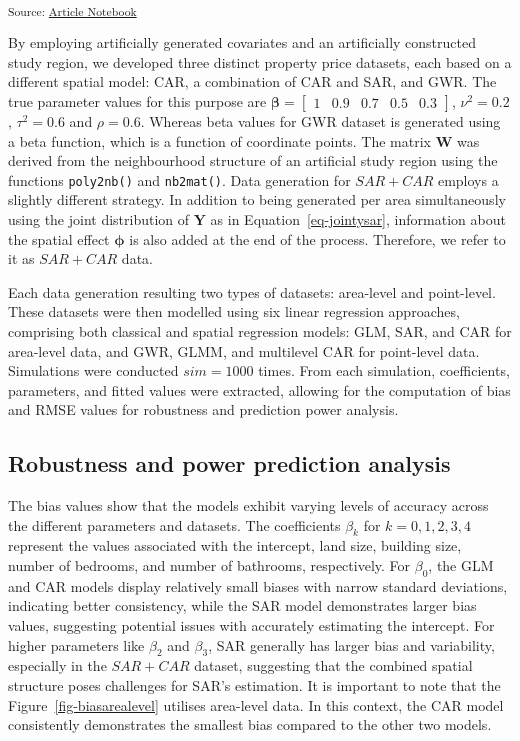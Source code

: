 \documentclass[
  default,
]{sn-jnl}
\begin{document}
\endgroup{}

\textsubscript{Source:
\href{https://indiraputeri-phd.github.io/CAR_simcomp/manuscript.qmd.html}{Article
Notebook}}

By employing artificially generated covariates and an artificially
constructed study region, we developed three distinct property price
datasets, each based on a different spatial model: CAR, a combination of
CAR and SAR, and GWR. The true parameter values for this purpose are
\(\boldsymbol{\beta} = \begin{bmatrix} 1 & 0.9 & 0.7 & 0.5 & 0.3 \end{bmatrix}\),
\(\nu^2 = 0.2\), \(\tau^2 = 0.6\) and \(\rho = 0.6\). Whereas beta
values for GWR dataset is generated using a beta function, which is a
function of coordinate points. The matrix \(\mathbf{W}\) was derived
from the neighbourhood structure of an artificial study region using the
functions \texttt{poly2nb()} and \texttt{nb2mat()}. Data generation for
\(SAR + CAR\) employs a slightly different strategy. In addition to
being generated per area simultaneously using the joint distribution of
\(\mathbf{Y}\) as in Equation~\ref{eq-jointysar}, information about the
spatial effect \(\boldsymbol{\phi}\) is also added at the end of the
process. Therefore, we refer to it as \(SAR + CAR\) data.

Each data generation resulting two types of datasets: area-level and
point-level. These datasets were then modelled using six linear
regression approaches, comprising both classical and spatial regression
models: GLM, SAR, and CAR for area-level data, and GWR, GLMM, and
multilevel CAR for point-level data. Simulations were conducted
\(sim = 1000\) times. From each simulation, coefficients, parameters,
and fitted values were extracted, allowing for the computation of bias
and RMSE values for robustness and prediction power analysis.

\subsection{Robustness and power prediction
analysis}\label{robustness-and-power-prediction-analysis}

The bias values show that the models exhibit varying levels of accuracy
across the different parameters and datasets. The coefficients
\(\beta_k\) for \(k = 0, 1, 2, 3, 4\) represent the values associated
with the intercept, land size, building size, number of bedrooms, and
number of bathrooms, respectively. For \(\beta_0\), the GLM and CAR
models display relatively small biases with narrow standard deviations,
indicating better consistency, while the SAR model demonstrates larger
bias values, suggesting potential issues with accurately estimating the
intercept. For higher parameters like \(\beta_2\) and \(\beta_3\), SAR
generally has larger bias and variability, especially in the
\(SAR + CAR\) dataset, suggesting that the combined spatial structure
poses challenges for SAR's estimation. It is important to note that the
Figure~\ref{fig-biasarealevel} utilises area-level data. In this
context, the CAR model consistently demonstrates the smallest bias
compared to the other two models.
\end{document}
